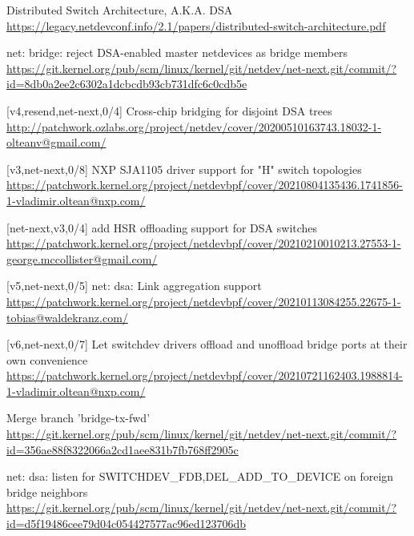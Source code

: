 \documentclass[letterpaper]{article}
\begin{document}
\begin{minipage}{\textwidth}
\begin{thebibliography}{2}

Distributed Switch Architecture, A.K.A. DSA\\
\url{https://legacy.netdevconf.info/2.1/papers/distributed-switch-architecture.pdf}

net: bridge: reject DSA-enabled master netdevices as bridge members\\
\url{https://git.kernel.org/pub/scm/linux/kernel/git/netdev/net-next.git/commit/?id=8db0a2ee2c6302a1dcbcdb93cb731dfc6c0cdb5e}

[v4,resend,net-next,0/4] Cross-chip bridging for disjoint DSA trees\\
\url{http://patchwork.ozlabs.org/project/netdev/cover/20200510163743.18032-1-olteanv@gmail.com/}

[v3,net-next,0/8] NXP SJA1105 driver support for "H" switch topologies\\
\url{https://patchwork.kernel.org/project/netdevbpf/cover/20210804135436.1741856-1-vladimir.oltean@nxp.com/}

[net-next,v3,0/4] add HSR offloading support for DSA switches\\
\url{https://patchwork.kernel.org/project/netdevbpf/cover/20210210010213.27553-1-george.mccollister@gmail.com/}

[v5,net-next,0/5] net: dsa: Link aggregation support\\
\url{https://patchwork.kernel.org/project/netdevbpf/cover/20210113084255.22675-1-tobias@waldekranz.com/}

[v6,net-next,0/7] Let switchdev drivers offload and unoffload bridge ports at their own convenience\\
\url{https://patchwork.kernel.org/project/netdevbpf/cover/20210721162403.1988814-1-vladimir.oltean@nxp.com/}

Merge branch 'bridge-tx-fwd'\\
\url{https://git.kernel.org/pub/scm/linux/kernel/git/netdev/net-next.git/commit/?id=356ae88f8322066a2cd1aee831b7fb768ff2905c}

net: dsa: listen for SWITCHDEV\_{FDB,DEL}\_ADD\_TO\_DEVICE on foreign bridge neighbors\\
\url{https://git.kernel.org/pub/scm/linux/kernel/git/netdev/net-next.git/commit/?id=d5f19486cee79d04c054427577ac96ed123706db}


\end{thebibliography}
\end{minipage}
\end{document}

